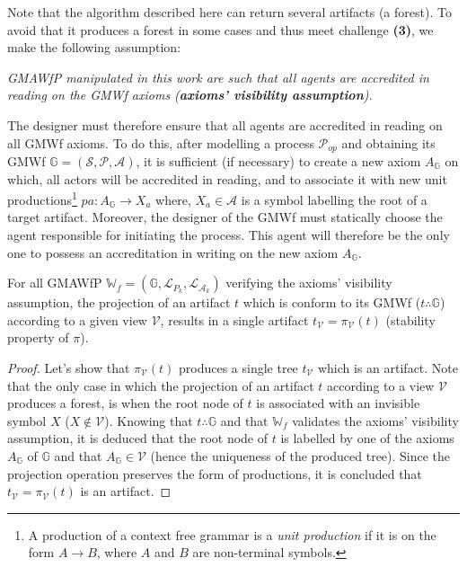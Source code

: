 Note that the algorithm described here can return several artifacts (a forest). To avoid that it produces a forest in some cases and thus meet challenge \textbf{(3)}, we make the following assumption: 
\begin{displayquote}
\textit{GMAWfP manipulated in this work are such that all agents are accredited in reading on the GMWf axioms (\textbf{axioms' visibility assumption}).}
\end{displayquote}
The designer must therefore ensure that all agents are accredited in reading on all GMWf axioms. To do this, after modelling a process $\mathcal{P}_{op}$ and obtaining its GMWf $\mathbb{G}=\left(\mathcal{S},\mathcal{P},\mathcal{A}\right)$, it is sufficient (if necessary) to create a new axiom $A_{\mathbb{G}}$ on which, all actors will be accredited in reading, and to associate it with new unit productions\footnote{A production of a context free grammar is a \textit{unit production} if it is on the form $A \rightarrow B$, where $A$ and $B$ are non-terminal symbols.} $pa : A_{\mathbb{G}} \rightarrow X_a$ where, $X_a \in \mathcal{A}$ is a symbol labelling the root of a target artifact.
Moreover, the designer of the GMWf must statically choose the agent responsible for initiating the process. This agent will therefore be the only one to possess an accreditation in writing on the new axiom $A_{\mathbb{G}}$.

\begin{proposition}
	\label{propositionStabiliteProjArt}
	For all GMAWfP $\mathbb{W}_f=\left(\mathbb{G}, \mathcal{L}_{P_k}, \mathcal{L}_{\mathcal{A}_k} \right)$ verifying the axioms' visibility assumption, the projection of an artifact $t$ which is conform to its GMWf ($t \therefore \mathbb{G}$) according to a given view $\mathcal{V}$, results in a single artifact $t_{\mathcal{V}}=\pi_{\mathcal{V}} \left(t\right)$ (stability property of $\pi$).
\end{proposition}

\begin{proof}
	Let's show that $\pi_{\mathcal{V}} \left(t\right)$ produces a single tree $t_{\mathcal{V}}$ which is an artifact. 
	Note that the only case in which the projection of an artifact $t$ according to a view $\mathcal{V}$ produces a forest, is when the root node of $t$ is associated with an invisible symbol $X$ ($X \notin \mathcal{V}$). Knowing that $t \therefore \mathbb{G}$ and that $\mathbb{W}_f$ validates the axioms' visibility assumption, it is deduced that the root node of $t$ is labelled by one of the axioms $A_{\mathbb{G}}$ of $\mathbb{G}$ and that $A_{\mathbb{G}} \in \mathcal{V}$ (hence the uniqueness of the produced tree). Since the projection operation preserves the form of productions, it is concluded that $t_{\mathcal{V}}=\pi_{\mathcal{V}} \left(t\right)$ is an artifact.
\end{proof}

